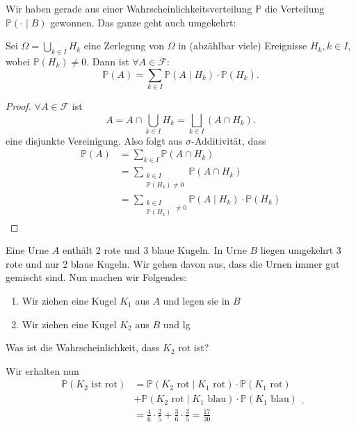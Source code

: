 Wir haben gerade aus einer Wahrscheinlichkeitsverteilung $\mathbb{P}$ die Verteilung $\mathbb{P}(\cdot \mid B)$ gewonnen. Das ganze geht auch umgekehrt:
\begin{theorem}\label{thm:zerlegung-in-ereignisse-ergibt-aufaddieren-bedingter-wahrscheinlichkeiten}
    Sei $\Omega = \bigcup_{k\in I} H_k$ eine  Zerlegung von $\Omega$ in (abzählbar viele) Ereignisse $H_k, k\in I$, wobei $\mathbb{P}(H_k) \neq 0$. Dann ist $\forall A\in \mathcal{F}$:
    \[
        \mathbb{P}(A) = \sum_{k\in I} \mathbb{P}(A \mid H_k) \cdot \mathbb{P}(H_k)
    .\] 
\end{theorem}
\begin{proof}
    $\forall A\in \mathcal{F}$ ist
    \[
        A= A \cap  \bigcup_{k\in I} H_k = \bigsqcup_{k\in I} (A\cap H_k) 
    .\] 
    eine disjunkte Vereinigung. Also folgt aus $\sigma$-Additivität, dass
    \begin{equation*}
        \begin{split}
            \mathbb{P}(A) &= \sum_{k\in I} \mathbb{P}(A\cap H_k) \\
                          &= \sum_{\substack{ k\in I\\ \mathbb{P}(H_k)\neq 0}} \mathbb{P}(A\cap H_k) \\
                          &=\sum_{\substack{ k\in I \\ \mathbb{P}(H_k)}\neq 0} \mathbb{P}(A\mid H_k) \cdot  \mathbb{P}(H_k)
        \end{split}
    \end{equation*}
\end{proof}
\begin{example}
    Eine Urne $A$ enthält {\color{red} 2 rote} und {\color{blue} 3 blaue} Kugeln. In Urne  $B$ liegen umgekehrt {\color{red} 3 rote} und nur {\color{blue} 2 blaue} Kugeln. Wir gehen davon aus, dass die Urnen immer gut gemischt sind. Nun machen wir Folgendes:
    \begin{enumerate}[label=\protect\circled{\arabic*}]
        \item Wir ziehen eine Kugel $K_1$ aus $A$ und legen sie in  $B$
        \item Wir ziehen eine Kugel  $K_2$ aus $B$ und lg
    \end{enumerate}
    \begin{question}
    Was ist die Wahrscheinlichkeit, dass $K_2$ {\color{red} rot} ist?
    \end{question}
Wir erhalten nun
\[
    \begin{split}
        \mathbb{P}(K_2 \text{ ist rot}) &= \mathbb{P}(K_2 \text{ rot} \mid  K_1 \text{ rot})\cdot \mathbb{P}(K_1 \text{ rot}) \\
                                        &+\mathbb{P}(K_2 \text{ rot}\mid K_1 \text{ blau})\cdot \mathbb{P}(K_1 \text{ blau}) \\
    &= \frac{4}{6}\cdot \frac{2}{5} + \frac{3}{6}\cdot \frac{3}{5} = \frac{17}{30}
    \end{split}
.\] 
\end{example}

